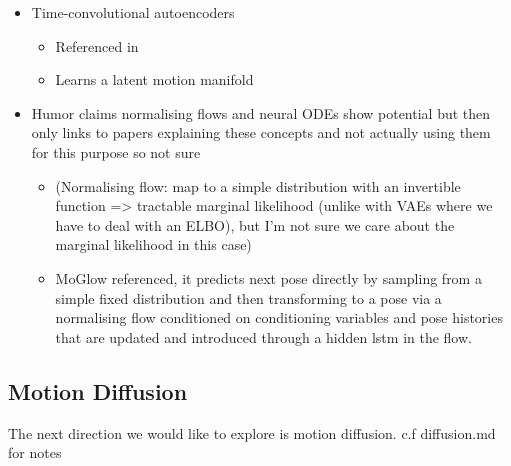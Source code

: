\begin{itemize}
\begin{itemize}
    \end{itemize}
    \item Time-convolutional autoencoders
    \begin{itemize}
        \item Referenced in \cite{MotionVAE}
        \item Learns a latent motion manifold
    \end{itemize}
    \item Humor claims normalising flows and neural ODEs show potential but then only links to papers explaining these concepts and not actually using them for this purpose so not sure
    \begin{itemize}
        \item (Normalising flow: map to a simple distribution with an invertible function => tractable marginal likelihood (unlike with VAEs where we have to deal with an ELBO), but I'm not sure we care about the marginal likelihood in this case)
        \item \cite{MoGlow} MoGlow referenced, it predicts next pose directly by sampling from a simple fixed distribution and then transforming to a pose via a normalising flow conditioned on conditioning variables and pose histories that are updated and introduced through a hidden lstm in the flow.
    \end{itemize}
\end{itemize}


\subsection{Motion Diffusion}
The next direction we would like to explore is motion diffusion.
c.f diffusion.md for notes

